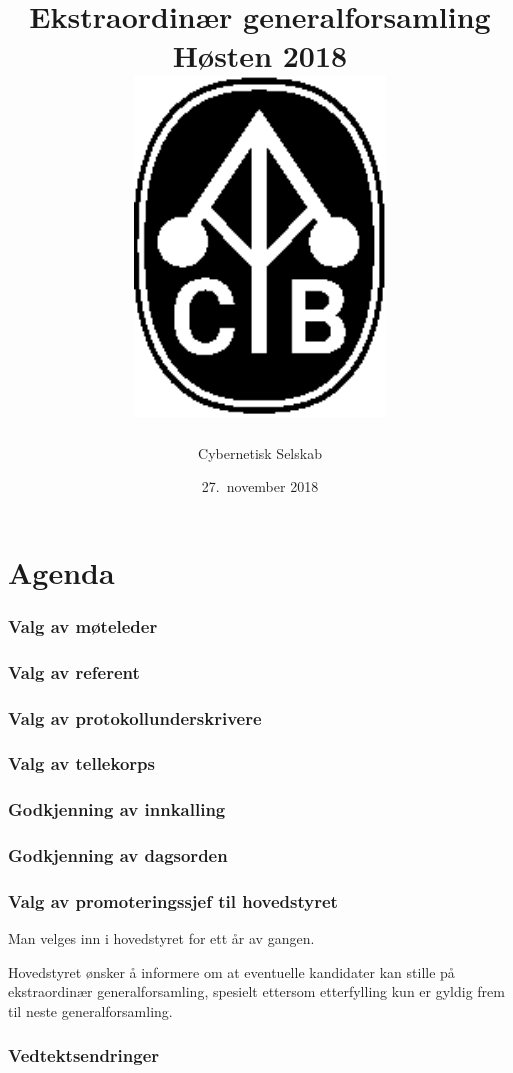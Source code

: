 \documentclass[10pt,norsk,a4paper]{article}
\title{Ekstraordinær generalforsamling \\
	Høsten 2018\\[3cm]
	\includegraphics[width=0.5\textwidth]{cyb-logo.eps}\\[-.5cm]}
\date{27.\ november 2018}
\author{Cybernetisk Selskab}
\begin{document}
\maketitle{}
\newpage
\tableofcontents

\part*{Agenda}

\section{Valg av møteleder}

\section{Valg av referent}

\section{Valg av protokollunderskrivere}

\section{Valg av tellekorps}

\section{Godkjenning av innkalling}

\section{Godkjenning av dagsorden}




\section{Valg av promoteringssjef til hovedstyret}
Man velges inn i hovedstyret for ett år av gangen.

Hovedstyret ønsker å informere om at eventuelle kandidater kan stille på ekstraordinær generalforsamling, spesielt ettersom etterfylling kun er gyldig frem til neste generalforsamling.


\section{Vedtektsendringer}
\end{document}
